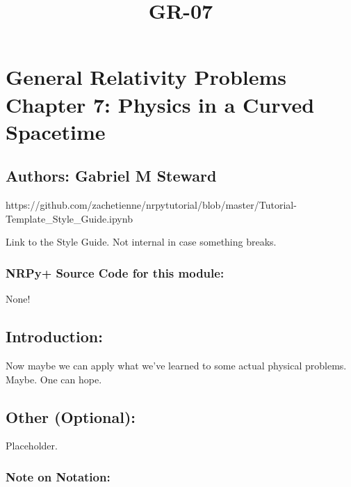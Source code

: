 \documentclass[landscape,letterpaper,10pt,english]{article}
\title{GR-07}
\begin{document}
    
    \maketitle
    
    

    
    \hypertarget{general-relativity-problems-chapter-7-physics-in-a-curved-spacetime}{%
\section{General Relativity Problems Chapter 7: Physics in a Curved
Spacetime}\label{general-relativity-problems-chapter-7-physics-in-a-curved-spacetime}}

\hypertarget{authors-gabriel-m-steward}{%
\subsection{Authors: Gabriel M
Steward}\label{authors-gabriel-m-steward}}

    https://github.com/zachetienne/nrpytutorial/blob/master/Tutorial-Template\_Style\_Guide.ipynb

Link to the Style Guide. Not internal in case something breaks.

    \hypertarget{nrpy-source-code-for-this-module}{%
\subsubsection{\texorpdfstring{ NRPy+ Source Code for this
module:}{ NRPy+ Source Code for this module:}}\label{nrpy-source-code-for-this-module}}

None!

\hypertarget{introduction}{%
\subsection{Introduction:}\label{introduction}}

Now maybe we can apply what we've learned to some actual physical
problems. Maybe. One can hope.

\hypertarget{other-optional}{%
\subsection{\texorpdfstring{ Other
(Optional):}{ Other (Optional):}}\label{other-optional}}

Placeholder.

\hypertarget{note-on-notation}{%
\subsubsection{Note on Notation:}\label{note-on-notation}}
\end{document}

